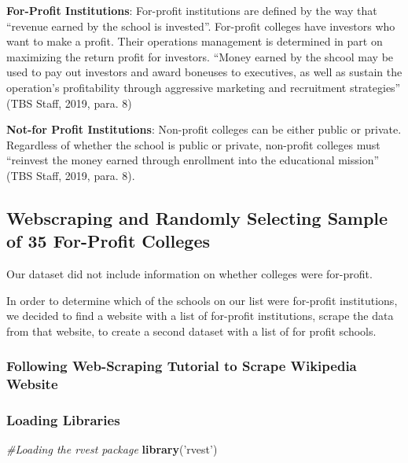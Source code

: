 \documentclass[
]{article}
\newenvironment{Shaded}{\begin{snugshade}}{\end{snugshade}}
\newcommand{\CommentTok}[1]{\textcolor[rgb]{0.56,0.35,0.01}{\textit{#1}}}
\newcommand{\KeywordTok}[1]{\textcolor[rgb]{0.13,0.29,0.53}{\textbf{#1}}}
\newcommand{\NormalTok}[1]{#1}
\newcommand{\StringTok}[1]{\textcolor[rgb]{0.31,0.60,0.02}{#1}}
\begin{document}
\textbf{For-Profit Institutions}: For-profit institutions are defined by
the way that ``revenue earned by the school is invested''. For-profit
colleges have investors who want to make a profit. Their operations
management is determined in part on maximizing the return profit for
investors. ``Money earned by the shcool may be used to pay out investors
and award boneuses to executives, as well as sustain the operation's
profitability through aggressive marketing and recruitment strategies''
(TBS Staff, 2019, para. 8)

\textbf{Not-for Profit Institutions}: Non-profit colleges can be either
public or private. Regardless of whether the school is public or
private, non-profit colleges must ``reinvest the money earned through
enrollment into the educational mission'' (TBS Staff, 2019, para. 8).

\hypertarget{webscraping-and-randomly-selecting-sample-of-35-for-profit-colleges}{%
\subsection{\texorpdfstring{\textbf{Webscraping and Randomly Selecting
Sample of 35 For-Profit
Colleges}}{Webscraping and Randomly Selecting Sample of 35 For-Profit Colleges}}\label{webscraping-and-randomly-selecting-sample-of-35-for-profit-colleges}}

Our dataset did not include information on whether colleges were
for-profit.

In order to determine which of the schools on our list were for-profit
institutions, we decided to find a website with a list of for-profit
institutions, scrape the data from that website, to create a second
dataset with a list of for profit schools.

\hypertarget{following-web-scraping-tutorial-to-scrape-wikipedia-website}{%
\subsubsection{Following Web-Scraping Tutorial to Scrape Wikipedia
Website}\label{following-web-scraping-tutorial-to-scrape-wikipedia-website}}

\hypertarget{loading-libraries}{%
\subsubsection{Loading Libraries}\label{loading-libraries}}

\begin{Shaded}
\begin{Highlighting}[]
\CommentTok{#Loading the rvest package}
\KeywordTok{library}\NormalTok{(}\StringTok{'rvest'}\NormalTok{)}
\end{Highlighting}
\end{Shaded}
\end{document}
